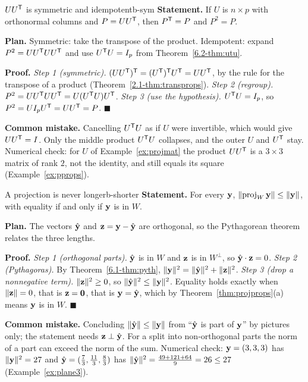\documentclass[11pt]{article}
\begin{document}
\begin{exmp}{$UU^{\mathsf T}$ is symmetric and idempotent}{b-sym}
\textbf{Statement.} If $U$ is $n\times p$ with orthonormal columns and $P=UU^{\mathsf T}$, then $P^{\mathsf T}=P$ and $P^2=P$.

\textbf{Plan.} Symmetric: take the transpose of the product. Idempotent: expand $P^2=UU^{\mathsf T} UU^{\mathsf T}$ and use $U^{\mathsf T} U=I_p$ from Theorem~\ref{6.2-thm:utu}.

\textbf{Proof.}
\emph{Step 1 (symmetric).} $(UU^{\mathsf T})^{\mathsf T}=(U^{\mathsf T})^{\mathsf T} U^{\mathsf T}=UU^{\mathsf T}$, by the rule for the transpose of a product (Theorem~\ref{2.1-thm:transprops}).
\emph{Step 2 (regroup).} $P^2=UU^{\mathsf T} UU^{\mathsf T}=U(U^{\mathsf T} U)U^{\mathsf T}$.
\emph{Step 3 (use the hypothesis).} $U^{\mathsf T} U=I_p$, so $P^2=UI_pU^{\mathsf T}=UU^{\mathsf T}=P$. \qquad$\blacksquare$

\textbf{Common mistake.} Cancelling $U^{\mathsf T} U$ as if $U$ were invertible, which would give $UU^{\mathsf T}=I$. Only the middle product $U^{\mathsf T} U$ collapses, and the outer $U$ and $U^{\mathsf T}$ stay. Numerical check: for $U$ of Example~\ref{ex:projmat} the product $UU^{\mathsf T}$ is a $3\times3$ matrix of rank $2$, not the identity, and still equals its square (Example~\ref{ex:pprops}).
\end{exmp}

\begin{exmp}{A projection is never longer}{b-shorter}
\textbf{Statement.} For every $\mathbf{y}$, $\lVert\operatorname{proj}_W\mathbf{y}\rVert\le\lVert\mathbf{y}\rVert$, with equality if and only if $\mathbf{y}$ is in $W$.

\textbf{Plan.} The vectors $\hat{\mathbf{y}}$ and $\mathbf{z}=\mathbf{y}-\hat{\mathbf{y}}$ are orthogonal, so the Pythagorean theorem relates the three lengths.

\textbf{Proof.}
\emph{Step 1 (orthogonal parts).} $\hat{\mathbf{y}}$ is in $W$ and $\mathbf{z}$ is in $W^{\perp}$, so $\hat{\mathbf{y}}\cdot\mathbf{z}=0$.
\emph{Step 2 (Pythagoras).} By Theorem~\ref{6.1-thm:pyth}, $\lVert\mathbf{y}\rVert^2=\lVert\hat{\mathbf{y}}\rVert^2+\lVert\mathbf{z}\rVert^2$.
\emph{Step 3 (drop a nonnegative term).} $\lVert\mathbf{z}\rVert^2\ge0$, so $\lVert\hat{\mathbf{y}}\rVert^2\le\lVert\mathbf{y}\rVert^2$. Equality holds exactly when $\lVert\mathbf{z}\rVert=0$, that is $\mathbf{z}=\mathbf{0}$, that is $\mathbf{y}=\hat{\mathbf{y}}$, which by Theorem~\ref{thm:projprops}(a) means $\mathbf{y}$ is in $W$. \qquad$\blacksquare$

\textbf{Common mistake.} Concluding $\lVert\hat{\mathbf{y}}\rVert\le\lVert\mathbf{y}\rVert$ from ``$\hat{\mathbf{y}}$ is part of $\mathbf{y}$'' by pictures only; the statement needs $\mathbf{z}\perp\hat{\mathbf{y}}$. For a split into non-orthogonal parts the norm of a part can exceed the norm of the sum. Numerical check: $\mathbf{y}=(3,3,3)$ has $\lVert\mathbf{y}\rVert^2=27$ and $\hat{\mathbf{y}}=(\tfrac73,\tfrac{11}3,\tfrac83)$ has $\lVert\hat{\mathbf{y}}\rVert^2=\tfrac{49+121+64}9=26\le27$ (Example~\ref{ex:plane3}).
\end{exmp}
\end{document}
